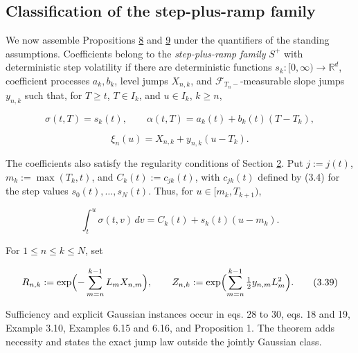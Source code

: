 \documentclass[11pt]{article}
\begin{document}
\subsection{Classification of the step-plus-ramp family}\label{sec:3.8}

We now assemble Propositions \hyperref[res:Proposition-8]{8} and \hyperref[res:Proposition-9]{9} under the quantifiers of the standing assumptions. Coefficients belong to the \emph{step-plus-ramp family} \(S^+\) with deterministic step volatility if there are deterministic functions \(s_k : [0,\infty) \to \mathbb R^d\), coefficient processes \(a_k,b_k\), level jumps \(X_{n,k}\), and \(\mathcal F_{T_n-}\)-measurable slope jumps \(y_{n,k}\) such that, for \(T \ge t\), \(T \in I_k\), and \(u \in I_k\), \(k \ge n\),

\begin{equation*}
\sigma(t,T) = s_k(t), \qquad \alpha(t,T) = a_k(t) + b_k(t)(T-T_k), \tag{3.36}\label{eq:3.36}
\end{equation*}

\begin{equation*}
\xi_n(u) = X_{n,k} + y_{n,k}(u-T_k). \tag{3.37}\label{eq:3.37}
\end{equation*}

The coefficients also satisfy the regularity conditions of Section \hyperref[sec:2]{2}. Put \(j := j(t)\), \(m_k := \max(T_k,t)\), and \(C_k(t) := c_{j k}(t)\), with \(c_{jk}(t)\) defined by (3.4) for the step values \(s_0(t),\dots,s_N(t)\). Thus, for \(u \in [m_k,T_{k+1})\),

\begin{equation*}
\int_t^u \sigma(t,v)\,dv = C_k(t) + s_k(t)(u-m_k). \tag{3.38}\label{eq:3.38}
\end{equation*}

For \(1 \le n \le k \le N\), set

\begin{equation*}
R_{n,k} := \exp\Bigl(-\sum_{m=n}^{k-1}L_m X_{n,m}\Bigr), \qquad Z_{n,k} := \exp\Bigl(\sum_{m=n}^{k-1}\tfrac12 y_{n,m}L_m^2\Bigr). \tag{3.39}\label{eq:3.39}
\end{equation*}

Sufficiency and explicit Gaussian instances occur in \cite{gellert2021short} eqs. 28 to 30, \cite{brace2024sofr} eqs. 18 and 19, \cite{fontana2022term} Example 3.10, \cite{kellerressel2018affine} Examples 6.15 and 6.16, and \cite{kim2014jumps} Proposition 1. The theorem adds necessity and states the exact jump law outside the jointly Gaussian class.
\end{document}
